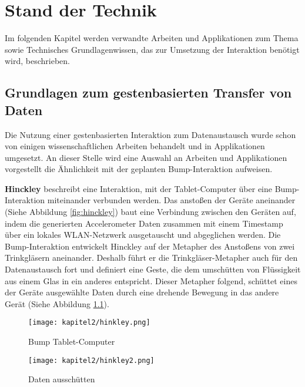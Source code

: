\chapter{Stand der Technik}
\label{Kap2}
\label{chap:Kap2}

Im folgenden Kapitel werden verwandte Arbeiten und Applikationen zum Thema sowie Technisches Grundlagenwissen, das zur Umsetzung der Interaktion benötigt wird, beschrieben.

\section{Grundlagen zum gestenbasierten Transfer von Daten}

Die Nutzung einer gestenbasierten Interaktion zum Datenaustausch wurde schon von einigen wissenschaftlichen Arbeiten behandelt und in Applikationen umgesetzt. An dieser Stelle wird eine Auswahl an Arbeiten und Applikationen vorgestellt die Ähnlichkeit mit der geplanten Bump-Interaktion aufweisen.

\textbf{Hinckley} \cite{Hinckley:2003:SGM:964696.964713} beschreibt eine Interaktion, mit der Tablet-Computer über eine Bump-Interaktion miteinander verbunden werden. Das anstoßen der Geräte aneinander (Siehe Abbildung \ref{fig:hinckley}) baut eine Verbindung zwischen den Geräten auf, indem die generierten Accelerometer Daten zusammen mit einem Timestamp über ein lokales WLAN-Netzwerk ausgetauscht und abgeglichen werden. Die Bump-Interaktion entwickelt Hinckley auf der Metapher des Anstoßens von zwei Trinkgläsern aneinander. Deshalb führt er die Trinkgläser-Metapher auch für den Datenaustausch fort und definiert eine Geste, die dem umschütten von Flüssigkeit aus einem Glas in ein anderes entspricht. Dieser Metapher folgend, schüttet eines der Geräte ausgewählte Daten durch eine drehende Bewegung in das andere Gerät (Siehe Abbildung \ref{fig:hinckley2}).

\begin{figure}[H]
\begin{minipage}[h]{7cm}
	\centering
	\texttt{[image: kapitel2/hinkley.png]}
	\caption{Bump Tablet-Computer \cite{Hinckley:2003:SGM:964696.964713}}
	\label{fig:hinckley}
\end{minipage}
\hfill
\begin{minipage}[h]{7cm}
	\centering
	\texttt{[image: kapitel2/hinkley2.png]}
	\caption{Daten ausschütten \cite{HinkleyPic2:Online}}
	\label{fig:hinckley2}
\end{minipage}
\end{figure}


